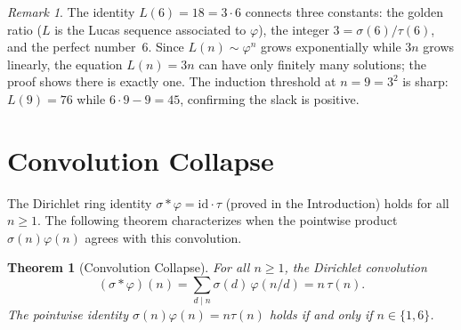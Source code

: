 \documentclass[11pt]{amsart}
\newtheorem{theorem}{Theorem}
\theoremstyle{remark}
\newtheorem*{remark}{Remark}
\begin{document}
\begin{remark}
The identity $L(6) = 18 = 3 \cdot 6$ connects three constants:
the golden ratio ($L$ is the Lucas sequence associated to $\varphi$),
the integer $3 = \sigma(6)/\tau(6)$, and the perfect number~$6$.
Since $L(n) \sim \varphi^n$ grows exponentially while $3n$ grows linearly,
the equation $L(n) = 3n$ can have only finitely many solutions;
the proof shows there is exactly one.
The induction threshold at $n = 9 = 3^2$ is sharp:
$L(9) = 76$ while $6 \cdot 9 - 9 = 45$, confirming the slack is positive.
\end{remark}

\section{Convolution Collapse}

The Dirichlet ring identity $\sigma * \varphi = \mathrm{id} \cdot \tau$
(proved in the Introduction) holds for all $n \geq 1$.
The following theorem characterizes when the pointwise product
$\sigma(n) \varphi(n)$ agrees with this convolution.

\begin{theorem}[Convolution Collapse]\label{thm:conv-collapse}
For all $n \geq 1$, the Dirichlet convolution
\[
  (\sigma * \varphi)(n) = \sum_{d \mid n} \sigma(d)\,\varphi(n/d) = n\,\tau(n).
\]
The pointwise identity $\sigma(n)\varphi(n) = n\tau(n)$
holds if and only if $n \in \{1, 6\}$.
\end{theorem}
\end{document}

